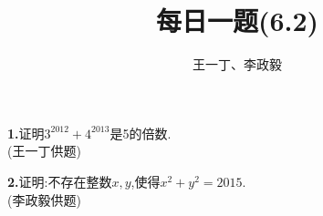 \documentclass[UTF8]{ctexart}
\title{每日一题(6.2)}
\author{王一丁、李政毅}
\begin{document}
\maketitle
\textbf{1.}证明$ 3^{2012}+4^{2013} $是5的倍数.\\
{(王一丁供题)}\\
\par\textbf{2.}证明:不存在整数$ x,y $,使得$ x^2+y^2=2015 $.\\
{(李政毅供题)}
\end{document}
